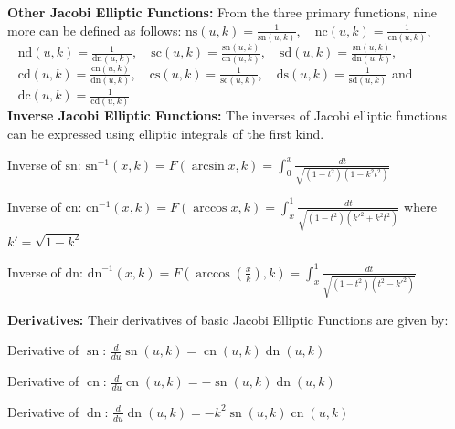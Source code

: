 \documentclass[12pt]{article}
\theoremstyle{plain}
\theoremstyle{definition}
\theoremstyle{remark}
\begin{document}
   \noindent
   \textbf{Other Jacobi Elliptic Functions:} From the three primary functions, nine more can be defined as follows: \(\text{ns}(u,k)=\frac{1}{\text{sn}(u,k)}\), \(\;\;\;\text{nc}(u,k)=\frac{1}{\text{cn}(u,k)}\), \(\;\;\;\text{nd}(u,k)=\frac{1}{\text{dn}(u,k)}\), \(\;\;\;\text{sc}(u,k)=\frac{\text{sn}(u,k)}{\text{cn}(u,k)}\), \(\;\;\;\text{sd}(u,k)=\frac{\text{sn}(u,k)}{\text{dn}(u,k)}\), \(\;\;\;\text{cd}(u,k)=\frac{\text{cn}(u,k)}{\text{dn}(u,k)}\), \(\;\;\;\text{cs}(u,k)=\frac{1}{\text{sc}(u,k)}\), \(\;\;\;\text{ds}(u,k)=\frac{1}{\text{sd}(u,k)}\) and \(\;\;\;\text{dc}(u,k)=\frac{1}{\text{cd}(u,k)}\)\\
   
   \noindent
   \textbf{Inverse Jacobi Elliptic Functions: }The inverses of Jacobi elliptic functions can be expressed using elliptic integrals of the first kind.
   
   Inverse of $\text{sn}$: \(\text{sn}^{-1}(x, k) = F(\arcsin x, k) = \int_0^x \frac{dt}{\sqrt{(1 - t^2)(1 - k^2 t^2)}}\)	
   
   Inverse of $\text{cn}$: \(\text{cn}^{-1}(x, k) = F(\arccos x, k) = \int_x^1 \frac{dt}{\sqrt{(1 - t^2)(k'^2 + k^2 t^2)}}\) where \(k' = \sqrt{1 - k^2}\)
   
   Inverse of $\text{dn}$:	\(\text{dn}^{-1}(x, k) = F(\arccos(\tfrac{x}{k}), k) = \int_x^1 \frac{dt}{\sqrt{(1 - t^2)(t^2 - k'^2)}}\)
   
   \noindent
   \textbf{Derivatives: }Their derivatives of basic Jacobi Elliptic Functions are given by:
   
   
   Derivative of \(\operatorname{sn}\): \(\frac{d}{du}\operatorname{sn}(u, k) = \operatorname{cn}(u, k)\operatorname{dn}(u, k)\)
   \vspace{0.2cm}
   
   Derivative of \(\operatorname{cn}\): \(\frac{d}{du}\operatorname{cn}(u, k) = -\operatorname{sn}(u, k)\operatorname{dn}(u, k)\)
   \vspace{0.2cm} 
   
   Derivative of \(\operatorname{dn}\): \(\frac{d}{du}\operatorname{dn}(u, k) = -k^2 \operatorname{sn}(u, k)\operatorname{cn}(u, k)\)
  
\end{document}
